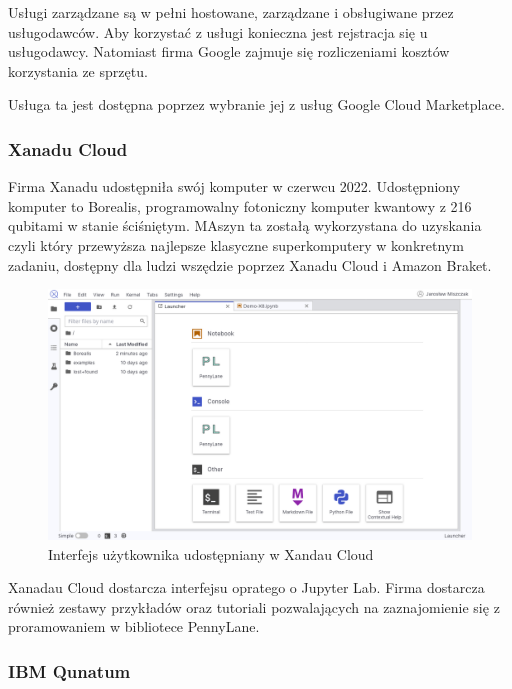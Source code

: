\documentclass[a4paper,12pt
]{article}
\begin{document}
Usługi zarządzane są w pełni hostowane, zarządzane i obsługiwane przez
usługodawców. Aby korzystać z usługi konieczna jest rejstracja się u
usługodawcy. Natomiast firma Google zajmuje się rozliczeniami kosztów
korzystania ze sprzętu.

Usługa ta jest dostępna poprzez wybranie jej z usług Google Cloud
Marketplace.

\hypertarget{xanadu-cloud}{%
\subsubsection{Xanadu Cloud}\label{xanadu-cloud}}

Firma Xanadu udostępniła swój komputer w czerwcu 2022. Udostępniony
komputer to Borealis, programowalny fotoniczny komputer kwantowy z 216
qubitami w stanie ściśniętym. MAszyn ta zostałą wykorzystana do
uzyskania czyli który przewyższa najlepsze klasyczne superkomputery w
konkretnym zadaniu, dostępny dla ludzi wszędzie poprzez Xanadu Cloud i
Amazon Braket.

\begin{figure}
\centering
\includegraphics{xanadu-cloud-interface.png}
\caption{Interfejs użytkownika udostępniany w Xandau Cloud}
\end{figure}

Xanadau Cloud dostarcza interfejsu opratego o Jupyter Lab. Firma
dostarcza również zestawy przykładów oraz tutoriali pozwalających na
zaznajomienie się z proramowaniem w bibliotece PennyLane.

\hypertarget{ibm-qunatum}{%
\subsubsection{IBM Qunatum}\label{ibm-qunatum}}
\end{document}
